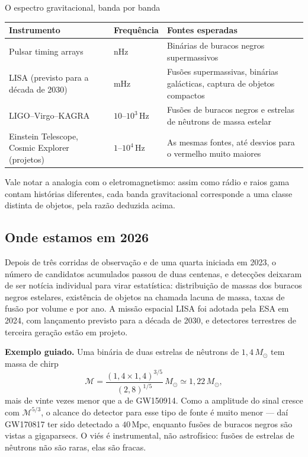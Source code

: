 \documentclass[11pt,a4paper]{article}
\begin{document}
\begin{lessonblock}{O espectro gravitacional, banda por banda}
\begin{tabular}{>{\raggedright\arraybackslash}p{}>{\raggedright\arraybackslash}p{}>{\raggedright\arraybackslash}p{}}
\toprule
Instrumento & Frequência & Fontes esperadas \\
\midrule
Pulsar timing arrays & nHz & Binárias de buracos negros supermassivos \\
LISA (previsto para a década de 2030) & mHz & Fusões supermassivas, binárias galácticas, captura de objetos compactos \\
LIGO--Virgo--KAGRA & $10$--$10^3\,\mathrm{Hz}$ & Fusões de buracos negros e estrelas de nêutrons de massa estelar \\
Einstein Telescope, Cosmic Explorer (projetos) & $1$--$10^4\,\mathrm{Hz}$ & As mesmas fontes, até desvios para o vermelho muito maiores \\
\bottomrule
\end{tabular}

Vale notar a analogia com o eletromagnetismo: assim como rádio e raios gama contam histórias diferentes, cada banda gravitacional corresponde a uma classe distinta de objetos, pela razão deduzida acima.
\end{lessonblock}

\subsection*{Onde estamos em 2026}

Depois de três corridas de observação e de uma quarta iniciada em 2023, o número de candidatos acumulados passou de duas centenas, e detecções deixaram de ser notícia individual para virar estatística: distribuição de massas dos buracos negros estelares, existência de objetos na chamada lacuna de massa, taxas de fusão por volume e por ano. A missão espacial LISA foi adotada pela ESA em 2024, com lançamento previsto para a década de 2030, e detectores terrestres de terceira geração estão em projeto.

\textbf{Exemplo guiado.} Uma binária de duas estrelas de nêutrons de $1{,}4\,M_\odot$ tem massa de chirp
\[
\mathcal{M}=\frac{(1{,}4\times1{,}4)^{3/5}}{(2{,}8)^{1/5}}\,M_\odot\simeq1{,}22\,M_\odot,
\]
mais de vinte vezes menor que a de GW150914. Como a amplitude do sinal cresce com $\mathcal{M}^{5/3}$, o alcance do detector para esse tipo de fonte é muito menor --- daí GW170817 ter sido detectado a $40\,\mathrm{Mpc}$, enquanto fusões de buracos negros são vistas a gigaparsecs. O viés é instrumental, não astrofísico: fusões de estrelas de nêutrons não são raras, elas são fracas.
\end{document}
